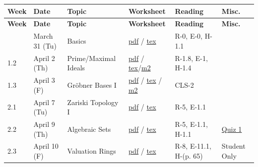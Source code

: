 \documentclass[11pt,letterpaper]{article}
\begin{document}
\begingroup
\fontsize{9.0}{11.4}\selectfont
\setlength{\tabcolsep}{3pt}
\renewcommand{\arraystretch}{1.2}
\setlength{\LTpre}{3pt}\setlength{\LTpost}{8pt}
\begin{longtable}{L{25pt}L{69pt}L{106pt}L{65pt}L{136pt}L{55pt}}
\toprule[0.9pt]
\sffamily\bfseries\color{Forest} Week & \sffamily\bfseries\color{Forest} Date & \sffamily\bfseries\color{Forest} Topic & \sffamily\bfseries\color{Forest} Worksheet & \sffamily\bfseries\color{Forest} Reading & \sffamily\bfseries\color{Forest} Misc. \\
\midrule
\endfirsthead
\toprule[0.9pt]
\sffamily\bfseries\color{Forest} Week & \sffamily\bfseries\color{Forest} Date & \sffamily\bfseries\color{Forest} Topic & \sffamily\bfseries\color{Forest} Worksheet & \sffamily\bfseries\color{Forest} Reading & \sffamily\bfseries\color{Forest} Misc. \\
\midrule
\endhead
\bottomrule
{} & March 31 (Tu) & Basics & \href{https://www.juliettebruce.xyz/teaching/121S26/1-1.pdf}{pdf} / \href{https://www.juliettebruce.xyz/teaching/121S26/1-1.tex}{tex} & R-0, E-0, H-1.1 &  \\
1.2 & April 2 (Th) & Prime/Maximal Ideals & \href{https://www.juliettebruce.xyz/teaching/121S26/1-2.pdf}{pdf} / \href{https://www.juliettebruce.xyz/teaching/121S26/1-2.tex}{tex}/\href{https://www.juliettebruce.xyz/teaching/121S26/1-2.m2}{m2} & R-1.8, E-1, H-1.4 &  \\
1.3 & April 3 (F) & Gröbner Bases I & \href{https://www.juliettebruce.xyz/teaching/121S26/1-3.pdf}{pdf} / \href{https://www.juliettebruce.xyz/teaching/121S26/1-3.tex}{tex} / \href{https://www.juliettebruce.xyz/teaching/121S26/1-3.m2}{m2} & CLS-2 &  \\
2.1 & April 7 (Tu) & Zariski Topology I & \href{https://www.juliettebruce.xyz/teaching/121S26/2-1.pdf}{pdf} / \href{https://www.juliettebruce.xyz/teaching/121S26/2-1.tex}{tex} & R-5, E-1.1 &  \\
2.2 & April 9 (Th) & Algebraic Sets & \href{https://www.juliettebruce.xyz/teaching/121S26/2-2.pdf}{pdf} / \href{https://www.juliettebruce.xyz/teaching/121S26/2-2.tex}{tex} & R-5, E-1.1, H-1.1 & \href{https://www.juliettebruce.xyz/teaching/121S26/quiz1.pdf}{Quiz 1} \\
2.3 & April 10 (F) & Valuation Rings & \href{https://www.juliettebruce.xyz/teaching/121S26/2-3.pdf}{pdf} / \href{https://www.juliettebruce.xyz/teaching/121S26/2-3.tex}{tex} & R-8, E-11.1, H-(p. 65) & Student Only \\

\end{longtable}
\end{document}
